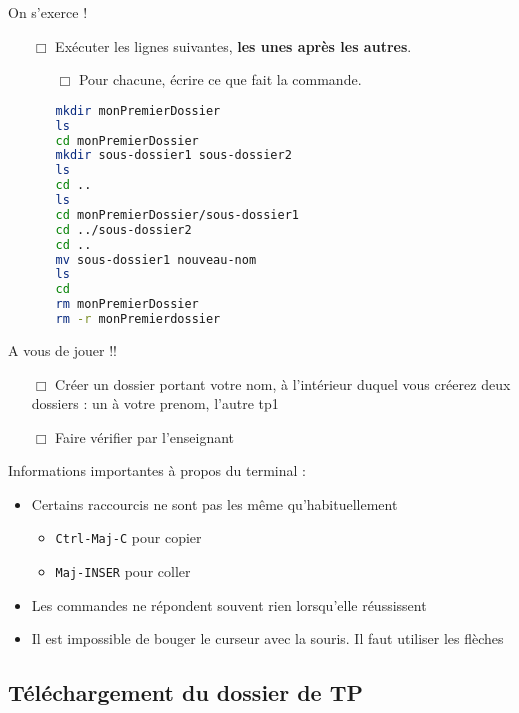 \begin{UPSTIManipulation}{On s'exerce !}
	\begin{itemize}
		\item[$\Box$] Exécuter les lignes suivantes, \textbf{les unes après les autres}.
		      \begin{itemize}
			      \item[$\Box$] Pour chacune, écrire ce que fait la commande.
			            \begin{lstlisting}[language=bash,style=console]
mkdir monPremierDossier
ls
cd monPremierDossier
mkdir sous-dossier1 sous-dossier2
ls
cd ..
ls
cd monPremierDossier/sous-dossier1
cd ../sous-dossier2
cd ..
mv sous-dossier1 nouveau-nom
ls
cd
rm monPremierDossier
rm -r monPremierdossier
\end{lstlisting}
		      \end{itemize}
	\end{itemize}
	A vous de jouer !!
	\begin{itemize}
		\item[$\Box$] Créer un dossier portant votre nom, à l'intérieur duquel vous créerez deux dossiers : un à votre prenom, l'autre tp1
		\item[$\Box$] Faire vérifier par l'enseignant
	\end{itemize}
\end{UPSTIManipulation}

\begin{UPSTIwarning}{Informations importantes à propos du terminal :}
	\begin{itemize}
		\item Certains raccourcis ne sont pas les même qu'habituellement
		      \begin{itemize}
			      \item \texttt{Ctrl-Maj-C} pour copier
			      \item \texttt{Maj-INSER} pour coller
		      \end{itemize}
		\item Les commandes ne répondent souvent rien lorsqu'elle réussissent
		\item Il est impossible de bouger le curseur avec la souris. Il faut utiliser les flèches
	\end{itemize}
\end{UPSTIwarning}

\subsection{Téléchargement du dossier de TP}

